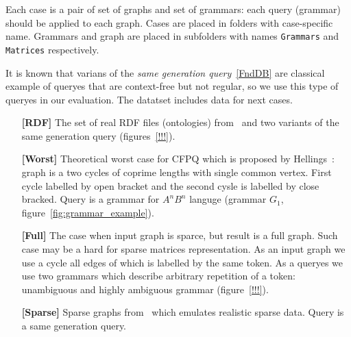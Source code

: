Each case is a pair of set of graphs and set of grammars: each query (grammar) should be applied to each graph.
Cases are placed in folders with case-specific name.
Grammars and graph are placed in subfolders with names \verb|Grammars| and \verb|Matrices| respectively.


It is known that varians of the \textit{same generation query}~\ref{FndDB} are classical example of queryes that are context-free but not regular, so we use this type of queryes in our evaluation.
The datatset includes data for next cases.
\begin{itemize}
\item[\textbf{[RDF]}] The set of real RDF files (ontologies) from~\cite{RDF} and two variants of the same generation query (figures~\ref{!!!}).

\item[\textbf{[Worst]}] Theoretical worst case for CFPQ which is proposed by Hellings~\cite{hellingsPathQuerying}: graph is a two cycles of coprime lengths with single common vertex.
First cycle labelled by open bracket and the second cysle is labelled by close bracked.
Query is a grammar for $A^nB^n$ languge (grammar $G_1$, figure~\ref{fig:grammar_example}).

\item[\textbf{[Full]}] The case when input graph is sparce, but result is a full graph. 
Such case may be a hard for sparse matrices representation.
As an input graph we use a cycle all edges of which is labelled by the same token.
As a queryes we use two grammars which describe arbitrary repetition of a token: unambiguous and highly ambiguous grammar (figure~\ref{!!!}). 

\item[\textbf{[Sparse]}] Sparse graphs from~\cite{fan2018scaling} which emulates realistic sparse data. 
Query is a same generation query.

\end{itemize}




